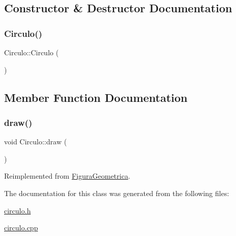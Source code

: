 \subsection{Constructor \& Destructor Documentation}
\mbox{\label{class_circulo_a6933bf908b78a4167684081a3a8f257f}} 
\subsubsection{\texorpdfstring{Circulo()}{Circulo()}}
{\footnotesize\ttfamily Circulo\+::\+Circulo (\begin{DoxyParamCaption}{ }\end{DoxyParamCaption})}



\subsection{Member Function Documentation}
\mbox{\label{class_circulo_aa94899872fb6c586d1343df1d9ce0d86}} 
\subsubsection{\texorpdfstring{draw()}{draw()}}
{\footnotesize\ttfamily void Circulo\+::draw (\begin{DoxyParamCaption}{ }\end{DoxyParamCaption})\hspace{0.3cm}{\ttfamily [virtual]}}



Reimplemented from \hyperlink{class_figura_geometrica_a417090ea2019fc1d58cdb345167aebea}{Figura\+Geometrica}.



The documentation for this class was generated from the following files\+:\begin{DoxyCompactItemize}
\item 
\hyperlink{circulo_8h}{circulo.\+h}\item 
\hyperlink{circulo_8cpp}{circulo.\+cpp}\end{DoxyCompactItemize}
